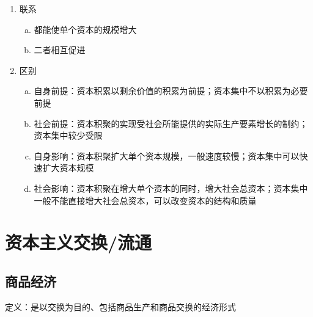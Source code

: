 \documentclass[12pt]{book}
\begin{document}
\begin{enumerate}[(1)]
    \item 联系
          \begin{enumerate}[a.]
              \item 都能使单个资本的规模增大
              \item 二者相互促进
          \end{enumerate}
    \item 区别
          \begin{enumerate}[a.]
              \item 自身前提：资本积累以剩余价值的积累为前提；资本集中不以积累为必要前提
              \item 社会前提：资本积聚的实现受社会所能提供的实际生产要素增长的制约；资本集中较少受限
              \item 自身影响：资本积聚扩大单个资本规模，一般速度较慢；资本集中可以快速扩大资本规模
              \item 社会影响：资本积聚在增大单个资本的同时，增大社会总资本；资本集中一般不能直接增大社会总资本，可以改变资本的结构和质量
          \end{enumerate}
\end{enumerate}








\section{资本主义交换/流通}



\subsection{商品经济}



定义：是以交换为目的、包括商品生产和商品交换的经济形式
\end{document}

